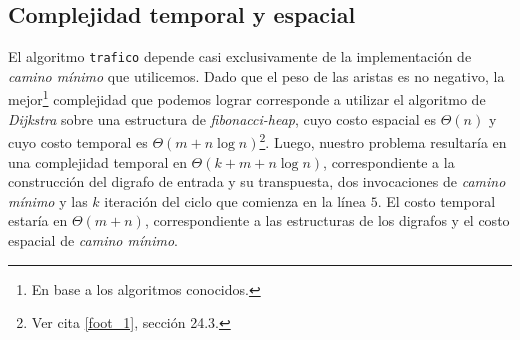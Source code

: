 \subsection{Complejidad temporal y espacial}

El algoritmo \texttt{trafico} depende casi exclusivamente de la implementación de \textit{camino mínimo} que utilicemos. Dado que el peso de las aristas es no negativo, la mejor\footnote{ En base a los algoritmos conocidos.} complejidad que podemos lograr corresponde a utilizar el algoritmo de \textit{Dijkstra} sobre una estructura de \textit{fibonacci-heap}, cuyo costo espacial es $\Theta(n)$ y cuyo costo temporal es $\Theta(m + n\log n)$\footnote{Ver cita \ref{foot_1}, sección 24.3.}. Luego, nuestro problema resultaría en una complejidad temporal en $\Theta(k + m + n\log n)$, correspondiente a la construcción del digrafo de entrada y su transpuesta, dos invocaciones de \textit{camino mínimo} y las $k$ iteración del ciclo que comienza en la línea $5$. El costo temporal estaría en $\Theta(m + n)$, correspondiente a las estructuras de los digrafos y el costo espacial de \textit{camino mínimo}. 
